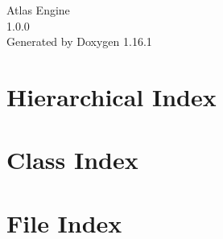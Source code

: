 \documentclass[twoside]{book}
\newcommand{\+}{\discretionary{\mbox{\scriptsize$\hookleftarrow$}}{}{}}
\newcommand{\clearemptydoublepage}{%
    \newpage{\pagestyle{empty}\cleardoublepage}%
  }
\begin{document}
  \raggedbottom
    \hypersetup{pageanchor=false,
                bookmarksnumbered=true,
                pdfencoding=unicode
               }
  \begin{titlepage}
  \vspace*{7cm}
  \begin{center}%
  {\Large Atlas Engine}\\
  [1ex]\large 1.\+0.\+0 \\
  \vspace*{1cm}
  {\large Generated by Doxygen 1.16.1}\\
  \end{center}
  \end{titlepage}
  \clearemptydoublepage
  \tableofcontents
  \clearemptydoublepage
  \hypersetup{pageanchor=true}
\chapter{Hierarchical Index}

\chapter{Class Index}

\chapter{File Index}

\end{document}
